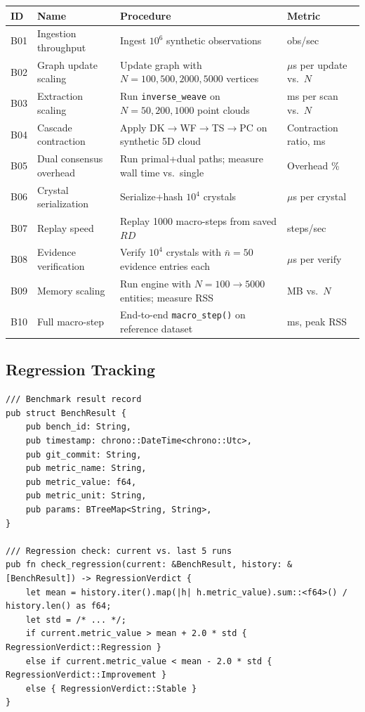 \documentclass[10pt,a4paper]{article}
\begin{document}
\begin{longtable}{l l p{5cm} l}
\toprule \textbf{ID} & \textbf{Name} & \textbf{Procedure} & \textbf{Metric} \\
\midrule\endhead
B01 & Ingestion throughput & Ingest $10^6$ synthetic observations & obs/sec \\
B02 & Graph update scaling & Update graph with $N=100,500,2000,5000$ vertices & $\mu$s per update vs.\ $N$ \\
B03 & Extraction scaling & Run \texttt{inverse\_weave} on $N=50,200,1000$ point clouds & ms per scan vs.\ $N$ \\
B04 & Cascade contraction & Apply DK$\to$WF$\to$TS$\to$PC on synthetic 5D cloud & Contraction ratio, ms \\
B05 & Dual consensus overhead & Run primal+dual paths; measure wall time vs.\ single & Overhead \% \\
B06 & Crystal serialization & Serialize+hash $10^4$ crystals & $\mu$s per crystal \\
B07 & Replay speed & Replay 1000 macro-steps from saved $RD$ & steps/sec \\
B08 & Evidence verification & Verify $10^4$ crystals with $\bar{n}=50$ evidence entries each & $\mu$s per verify \\
B09 & Memory scaling & Run engine with $N=100\to5000$ entities; measure RSS & MB vs.\ $N$ \\
B10 & Full macro-step & End-to-end \texttt{macro\_step()} on reference dataset & ms, peak RSS \\
\bottomrule
\end{longtable}

\subsection{Regression Tracking}

\begin{lstlisting}[style=rust]
/// Benchmark result record
pub struct BenchResult {
    pub bench_id: String,
    pub timestamp: chrono::DateTime<chrono::Utc>,
    pub git_commit: String,
    pub metric_name: String,
    pub metric_value: f64,
    pub metric_unit: String,
    pub params: BTreeMap<String, String>,
}

/// Regression check: current vs. last 5 runs
pub fn check_regression(current: &BenchResult, history: &[BenchResult]) -> RegressionVerdict {
    let mean = history.iter().map(|h| h.metric_value).sum::<f64>() / history.len() as f64;
    let std = /* ... */;
    if current.metric_value > mean + 2.0 * std { RegressionVerdict::Regression }
    else if current.metric_value < mean - 2.0 * std { RegressionVerdict::Improvement }
    else { RegressionVerdict::Stable }
}
\end{lstlisting}
\end{document}
